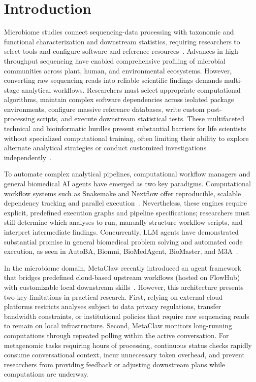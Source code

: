 \documentclass[10pt,letterpaper]{article}
\begin{document}
\section{Introduction}

Microbiome studies connect sequencing-data processing with taxonomic and
functional characterization and downstream statistics, requiring researchers to
select tools and configure software and reference
resources~\cite{knight2018bestpractices}. Advances in high-throughput
sequencing have enabled comprehensive profiling of microbial communities across
plant, human, and environmental ecosystems. However, converting raw sequencing
reads into reliable scientific findings demands multi-stage analytical
workflows. Researchers must select appropriate computational algorithms,
maintain complex software dependencies across isolated package environments,
configure massive reference databases, write custom post-processing scripts,
and execute downstream statistical tests. These multifaceted technical and
bioinformatic hurdles present substantial barriers for life scientists without
specialized computational training, often limiting their ability to explore
alternate analytical strategies or conduct customized investigations
independently~\cite{tong2020genepiper,liu2021practical}.

To automate complex analytical pipelines, computational workflow managers and
general biomedical AI agents have emerged as two key paradigms. Computational
workflow systems such as Snakemake and Nextflow offer reproducible, scalable
dependency tracking and parallel
execution~\cite{koster2012snakemake,ditommaso2017nextflow}. Nevertheless, these
engines require explicit, predefined execution graphs and pipeline
specifications; researchers must still determine which analyses to run,
manually structure workflow scripts, and interpret intermediate findings.
Concurrently, LLM agents have demonstrated substantial promise in general
biomedical problem solving and automated code execution, as seen in AutoBA,
Biomni, BioMedAgent, BioMaster, and
M3A~\cite{zhou2024autoba,huang2026biomni,bu2026biomedagent,su2026biomaster,johri2026m3a}.

In the microbiome domain, MetaClaw recently introduced an agent framework that
bridges predefined cloud-based upstream workflows (hosted on FlowHub) with
customizable local downstream skills~\cite{zhang2026metaclaw}. However, this
architecture presents two key limitations in practical research. First, relying
on external cloud platforms restricts analyses subject to data privacy
regulations, transfer bandwidth constraints, or institutional policies that
require raw sequencing reads to remain on local infrastructure. Second,
MetaClaw monitors long-running computations through repeated polling within the
active conversation. For metagenomic tasks requiring hours of processing,
continuous status checks rapidly consume conversational context, incur
unnecessary token overhead, and prevent researchers from providing feedback or
adjusting downstream plans while computations are underway.
\end{document}
